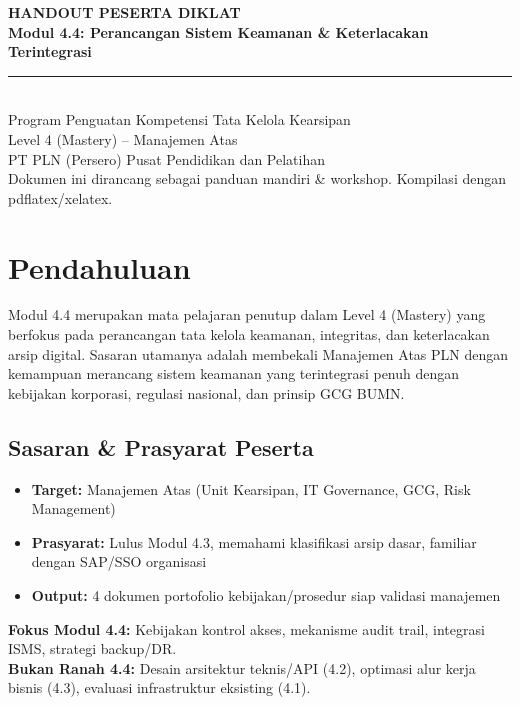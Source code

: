 \documentclass[12pt,a4paper]{report}
\begin{document}
\begin{titlepage}
\centering
\vspace*{2cm}
{\Huge\bfseries\color{plnblue} HANDOUT PESERTA DIKLAT}\\[0.5cm]
{\LARGE\bfseries Modul 4.4: Perancangan Sistem Keamanan \& Keterlacakan Terintegrasi}\\[1cm]
\rule{0.8\linewidth}{0.6pt}\\[0.5cm]
{\large Program Penguatan Kompetensi Tata Kelola Kearsipan}\\
{\large Level 4 (Mastery) -- Manajemen Atas}\\[1.5cm]
{\large PT PLN (Persero) \textbar{} Pusat Pendidikan dan Pelatihan}\\[3cm]
\vfill
{\small Dokumen ini dirancang sebagai panduan mandiri \& workshop. Kompilasi dengan pdflatex/xelatex.}
\end{titlepage}

\tableofcontents
\newpage

\chapter*{Pendahuluan}
Modul 4.4 merupakan mata pelajaran penutup dalam Level 4 (Mastery) yang berfokus pada perancangan tata kelola keamanan, integritas, dan keterlacakan arsip digital. Sasaran utamanya adalah membekali Manajemen Atas PLN dengan kemampuan merancang sistem keamanan yang terintegrasi penuh dengan kebijakan korporasi, regulasi nasional, dan prinsip GCG BUMN.

\section*{Sasaran \& Prasyarat Peserta}
\begin{itemize}[leftmargin=*]
    \item \textbf{Target:} Manajemen Atas (Unit Kearsipan, IT Governance, GCG, Risk Management)
    \item \textbf{Prasyarat:} Lulus Modul 4.3, memahami klasifikasi arsip dasar, familiar dengan SAP/SSO organisasi
    \item \textbf{Output:} 4 dokumen portofolio kebijakan/prosedur siap validasi manajemen
\end{itemize}

\begin{warnbox}
\textbf{Fokus Modul 4.4:} Kebijakan kontrol akses, mekanisme audit trail, integrasi ISMS, strategi backup/DR.\\
\textbf{Bukan Ranah 4.4:} Desain arsitektur teknis/API (4.2), optimasi alur kerja bisnis (4.3), evaluasi infrastruktur eksisting (4.1).
\end{warnbox}
\end{document}
